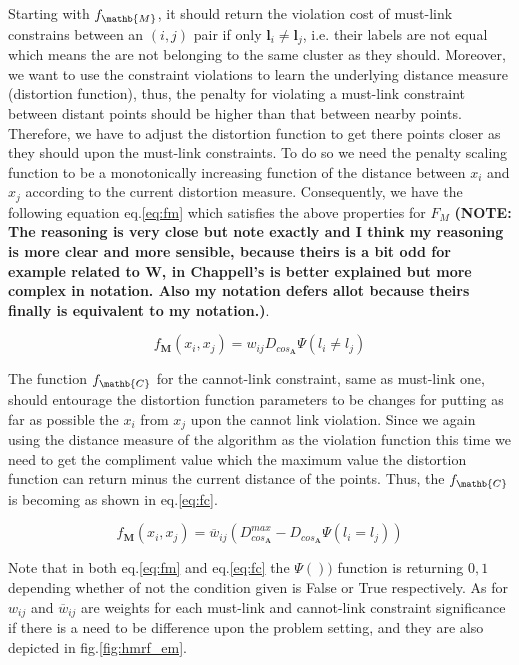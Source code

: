 \documentclass[dvips,dvipdfm,pdftex]{llncs}
\begin{document}
Starting with $f_{\mathb{M}}$, it should return the violation cost of must-link constrains between an $(i,j)$ pair if only $\mathbf{l}_{i} \neq \mathbf{l}_{j}$, i.e. their labels are not equal which means the are not belonging to the same cluster as they should. Moreover, we want to use the constraint violations to learn the underlying distance measure (distortion function), thus, the penalty for violating a must-link constraint between distant points should be higher than that between nearby points. Therefore, we have to adjust the distortion function to get there points closer as they should upon the must-link constraints. To do so we need the penalty scaling function to be a
monotonically increasing function of the distance between $x_i$ and $x_j$ according to the current distortion measure. Consequently, we have the following equation eq.\ref{eq:fm} which satisfies the above properties for $F_{M}$ \cite{basu2004probabilistic,chapelle2006semi_hmrf_kmeans} \textbf{(NOTE: The reasoning is very close but note exactly and I think my reasoning is more clear and more sensible, because theirs is a bit odd for example related to W, in Chappell's is better explained but more complex in notation. Also my notation defers allot because theirs finally is equivalent to my notation.)}.

\begin{equation}
	f_{\mathbf{M}}(x_{i},x_{j})=w_{ij}D_{cos_{\mathbf{A}}}\Psi(l_{i}\neq l_{j})
\label{eq:fm}
\end{equation}

The function $f_{\mathb{C}}$ for the cannot-link constraint, same as must-link one, should entourage the distortion function parameters to be changes for putting as far as possible the $x_{i}$ from $x_{j}$ upon the cannot link violation. Since we again using the distance measure of the algorithm as the violation function this time we need to get the compliment value which the maximum value the distortion function can return minus the current distance of the points. Thus, the $f_{\mathb{C}}$ is becoming as shown in eq.\ref{eq:fc}.

\begin{equation}
	f_{\mathbf{M}}(x_{i},x_{j})=\overline{w}_{ij}(D_{cos_{\mathbf{A}}}^{max}-D_{cos_{\mathbf{A}}}\Psi(l_{i}= l_{j}))
\label{eq:fc}
\end{equation}

Note that in both eq.\ref{eq:fm} and eq.\ref{eq:fc} the $\Psi())$ function is returning ${0,1}$ depending whether of not the condition given is False or True respectively. As for $w_{ij}$ and $\overline{w}_{ij}$ are weights for each must-link and cannot-link constraint significance if there is a need to be difference upon the problem setting, and they are also depicted in fig.\ref{fig:hmrf_em}.
\end{document}
